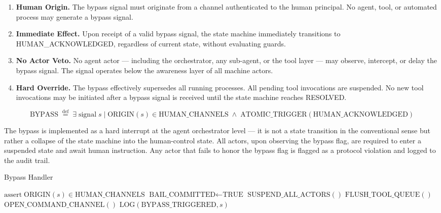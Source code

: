 \begin{enumerate}
  \item \textbf{Human Origin.} The bypass signal must originate from a channel authenticated to the human principal. No agent, tool, or automated process may generate a bypass signal.
  \item \textbf{Immediate Effect.} Upon receipt of a valid bypass signal, the state machine immediately transitions to HUMAN\_ACKNOWLEDGED, regardless of current state, without evaluating guards.
  \item \textbf{No Actor Veto.} No agent actor — including the orchestrator, any sub-agent, or the tool layer — may observe, intercept, or delay the bypass signal. The signal operates below the awareness layer of all machine actors.
  \item \textbf{Hard Override.} The bypass effectively supersedes all running processes. All pending tool invocations are suspended. No new tool invocations may be initiated after a bypass signal is received until the state machine reaches RESOLVED.
\end{enumerate}

\bigskip

\bigskip

\[
\text{BYPASS} \; \overset{\text{def}}{=} \; \exists \; \text{signal} \; s \;|\; \text{ORIGIN}(s) \in \text{HUMAN\_CHANNELS} \;\land\; \text{ATOMIC\_TRIGGER}(\text{HUMAN\_ACKNOWLEDGED})
\]

\bigskip

The bypass is implemented as a hard interrupt at the agent orchestrator level — it is not a state transition in the conventional sense but rather a collapse of the state machine into the human-control state. All actors, upon observing the bypass flag, are required to enter a suspended state and await human instruction. Any actor that fails to honor the bypass flag is flagged as a protocol violation and logged to the audit trail.

\bigskip

\begin{algorithm}
\caption{Bypass Handler}
\begin{algorithmic}[1]
    \State $\text{assert} \; \text{ORIGIN}(s) \in \text{HUMAN\_CHANNELS}$
    \State $\text{BAIL\_COMMITTED} \gets \text{TRUE}$ 
    \State $\text{SUSPEND\_ALL\_ACTORS}()$
    \State $\text{FLUSH\_TOOL\_QUEUE}()$
    \State $\text{OPEN\_COMMAND\_CHANNEL}()$
    \State $\text{LOG}(\text{BYPASS\_TRIGGERED}, s)$
    \State \Return {}
\EndFunction
\end{algorithmic}
\end{algorithm}

